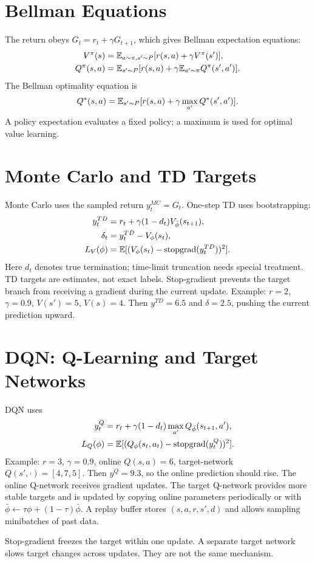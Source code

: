 \section{Bellman Equations}
The return obeys $G_t=r_t+\gamma G_{t+1}$, which gives Bellman expectation equations:
\begin{align}
V^\pi(s)&=\mathbb{E}_{a\sim\pi,s'\sim P}[r(s,a)+\gamma V^\pi(s')],\\
Q^\pi(s,a)&=\mathbb{E}_{s'\sim P}[r(s,a)+\gamma\mathbb{E}_{a'\sim\pi}Q^\pi(s',a')].
\end{align}
The Bellman optimality equation is
\begin{equation}Q^*(s,a)=\mathbb{E}_{s'\sim P}[r(s,a)+\gamma\max_{a'}Q^*(s',a')].\end{equation}
A policy expectation evaluates a fixed policy; a maximum is used for optimal value learning.
\section{Monte Carlo and TD Targets}
Monte Carlo uses the sampled return $y_t^{MC}=G_t$. One-step TD uses bootstrapping:
\begin{align}
y_t^{TD}&=r_t+\gamma(1-d_t)V_{\bar\phi}(s_{t+1}),\\
\delta_t&=y_t^{TD}-V_\phi(s_t),\\
L_V(\phi)&=\mathbb{E}[(V_\phi(s_t)-\operatorname{stopgrad}(y_t^{TD}))^2].
\end{align}
Here $d_t$ denotes true termination; time-limit truncation needs special treatment. TD targets are estimates, not exact labels. Stop-gradient prevents the target branch from receiving a gradient during the current update.
Example: $r=2$, $\gamma=0.9$, $V(s')=5$, $V(s)=4$. Then $y^{TD}=6.5$ and $\delta=2.5$, pushing the current prediction upward.
\section{DQN: Q-Learning and Target Networks}
DQN uses
\begin{align}
y_t^Q&=r_t+\gamma(1-d_t)\max_{a'}Q_{\bar\phi}(s_{t+1},a'),\\
L_Q(\phi)&=\mathbb{E}[(Q_\phi(s_t,a_t)-\operatorname{stopgrad}(y_t^Q))^2].
\end{align}
Example: $r=3$, $\gamma=0.9$, online $Q(s,a)=6$, target-network $Q(s',\cdot)=[4,7,5]$. Then $y^Q=9.3$, so the online prediction should rise.
The online Q-network receives gradient updates. The target Q-network provides more stable targets and is updated by copying online parameters periodically or with
$\bar\phi\leftarrow\tau\phi+(1-\tau)\bar\phi$.
A replay buffer stores $(s,a,r,s',d)$ and allows sampling minibatches of past data.
\begin{pitfall}
Stop-gradient freezes the target within one update. A separate target network slows target changes across updates. They are not the same mechanism.
\end{pitfall}
